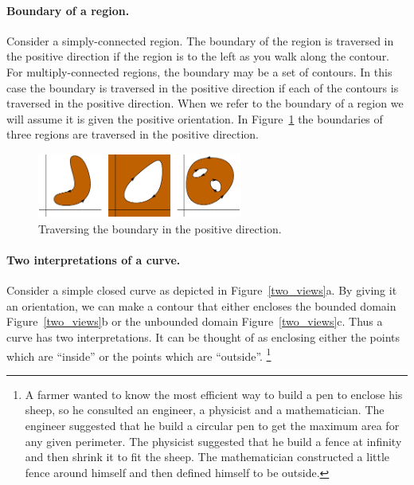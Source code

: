 \paragraph{Boundary of a region.}
Consider a simply-connected region.  The boundary of the region is
traversed in the positive direction if the region is to the left as you
walk along the contour.  For multiply-connected regions, the boundary
may be a set of contours.  In this case the boundary is traversed in the
positive direction if each of the contours is traversed in the positive
direction.  When we refer to the boundary of a region we will assume it
is given the positive orientation.
In Figure~\ref{pos_boundary} the boundaries of three regions
are traversed in the positive direction.

\begin{figure}[htb!]
  \begin{center}
    \includegraphics[width=0.6\textwidth]{fcv/function/pos_boundary}
  \end{center}
  \caption{Traversing the boundary in the positive direction.}
  \label{pos_boundary}
\end{figure}




\paragraph{Two interpretations of a curve.}
Consider a simple closed curve as depicted in Figure~\ref{two_views}a.
By giving it an orientation, we can make a contour that either
encloses the bounded domain Figure~\ref{two_views}b or the unbounded
domain Figure~\ref{two_views}c.  Thus a curve has two interpretations.
It can be thought of as enclosing either the points which are
``inside'' or the points which are ``outside''.%
\footnote{
  A farmer wanted to know the most efficient way to build a pen to
  enclose his sheep, so he consulted an engineer, a physicist and a
  mathematician.  The engineer suggested that he build a circular pen
  to get the maximum area for any given perimeter.  The physicist
  suggested that he build a fence at infinity and then shrink it to
  fit the sheep.  The mathematician constructed a little fence around
  himself and then defined himself to be outside.
  }



